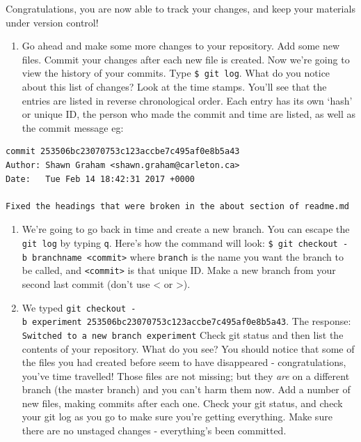 \documentclass[english,]{book}
\providecommand{\tightlist}{%
  \setlength{\itemsep}{0pt}\setlength{\parskip}{0pt}}
\begin{document}
Congratulations, you are now able to track your changes, and keep your
materials under version control!

\begin{enumerate}
\def\labelenumi{\arabic{enumi}.}
\setcounter{enumi}{2}
\tightlist
\item
  Go ahead and make some more changes to your repository. Add some new
  files. Commit your changes after each new file is created. Now we're
  going to view the history of your commits. Type \texttt{\$\ git\ log}.
  What do you notice about this list of changes? Look at the time
  stamps. You'll see that the entries are listed in reverse
  chronological order. Each entry has its own `hash' or unique ID, the
  person who made the commit and time are listed, as well as the commit
  message eg:
\end{enumerate}

\begin{verbatim}
commit 253506bc23070753c123accbe7c495af0e8b5a43
Author: Shawn Graham <shawn.graham@carleton.ca>
Date:   Tue Feb 14 18:42:31 2017 +0000

Fixed the headings that were broken in the about section of readme.md
\end{verbatim}

\begin{enumerate}
\def\labelenumi{\alph{enumi}.}
\tightlist
\item
  We're going to go back in time and create a new branch. You can escape
  the \texttt{git\ log} by typing \texttt{q}. Here's how the command
  will look:
  \texttt{\$\ git\ checkout\ -b\ branchname\ \textless{}commit\textgreater{}}
  where \texttt{branch} is the name you want the branch to be called,
  and \texttt{\textless{}commit\textgreater{}} is that unique ID. Make a
  new branch from your second last commit (don't use \textless{} or
  \textgreater{}).
\item
  We typed
  \texttt{git\ checkout\ -b\ experiment\ 253506bc23070753c123accbe7c495af0e8b5a43}.
  The response:
  \texttt{Switched\ to\ a\ new\ branch\ \textquotesingle{}experiment\textquotesingle{}}
  Check git status and then list the contents of your repository. What
  do you see? You should notice that some of the files you had created
  before seem to have disappeared - congratulations, you've time
  travelled! Those files are not missing; but they \emph{are} on a
  different branch (the master branch) and you can't harm them now. Add
  a number of new files, making commits after each one. Check your git
  status, and check your git log as you go to make sure you're getting
  everything. Make sure there are no unstaged changes - everything's
  been committed.
\end{enumerate}
\end{document}
